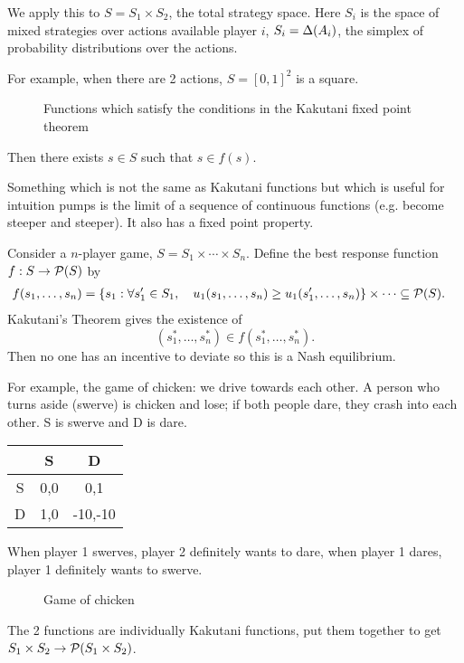 \documentclass[11pt]{article}
\begin{document}
We apply this to $S=S_1\times S_2$, the total strategy space. Here $S_i$ is the space of mixed strategies over actions available player $i$, $S_i = \Delta (A_i)$, the simplex of probability distributions over the actions.

For example, when there are 2 actions, $S=[0,1]^2$ is a square.

\begin{figure}
\caption{Functions which satisfy the conditions in the Kakutani fixed point theorem}
\end{figure}

Then there exists $s\in S$ such that $s\in f(s)$.

Something which is not the same as Kakutani functions but which is useful for intuition pumps is the limit of a sequence of continuous functions (e.g. become steeper and steeper). It also has a fixed point property.

Consider a $n$-player game, $S=S_1\times \cdots \times S_n$. Define the best response function $f:S\to \mathcal{P}(S)$ by
\begin{align}
f(s_1,\ldots, s_n) &= 
\left\{{s_1}:{\forall s_1'\in S_1,\quad u_1(s_1,\ldots, s_n)\ge u_1(s_1',\ldots, s_n)}\right\}\times \cdots \subseteq \mathcal{P}(S).
\end{align}
Kakutani's Theorem gives the existence of
$$
(s_1^*,\ldots, s_n^*)\in f(s_1^*,\ldots, s_n^*).$$ 
Then no one has an incentive to deviate so this is a Nash equilibrium.

For example, the game of chicken: we drive towards each other. A person who turns aside (swerve) is chicken and lose; if both people dare, they crash into each other.
S is swerve and D is dare.

\begin{center}
\begin{tabular}{c|c|c|}
& S & D\tabularnewline
\hline
S& 0,0 & 0,1\tabularnewline
\hline
D&1,0 &-10,-10\tabularnewline
\hline
\end{tabular}
\end{center}

When player 1 swerves, player 2 definitely wants to dare, when player 1 dares, player 1 definitely wants to swerve.

\begin{figure}
\caption{Game of chicken}
\end{figure}

The 2 functions are individually Kakutani functions, put them together to get $S_1\times S_2\to \mathcal{P}(S_1\times S_2)$. 
\end{document}
